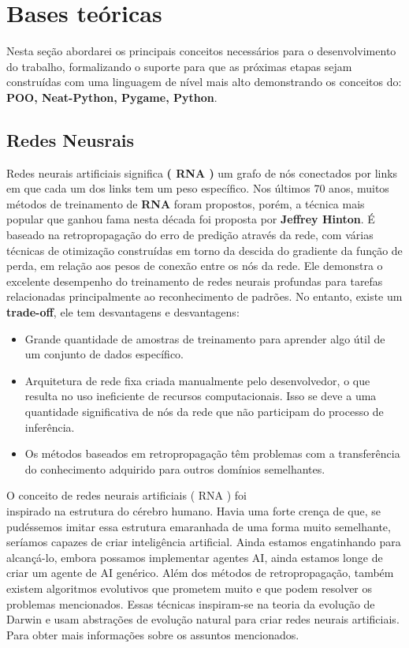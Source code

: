 \section{Bases teóricas}\label{sec:theory}
Nesta seção abordarei os principais conceitos necessários para o desenvolvimento do trabalho, formalizando o suporte para que as próximas etapas sejam construídas com uma
linguagem de nível mais alto demonstrando os conceitos do:\\ \textbf{POO, Neat-Python, Pygame, Python}.
\subsection{Redes Neusrais}
Redes neurais artificiais significa \textbf{( RNA )} um grafo de nós conectados por links em que cada um dos links tem um peso específico.
Nos últimos 70 anos, muitos métodos de treinamento de \textbf{RNA} foram propostos, porém, a técnica mais popular que ganhou fama nesta década foi proposta por \textbf{Jeffrey Hinton}.\cite{rna} É baseado na retropropagação do erro de predição através da rede, com várias técnicas de otimização construídas em torno da descida do gradiente da função de perda, em relação aos pesos de conexão entre os nós da rede. Ele demonstra o excelente desempenho do treinamento de redes neurais profundas para tarefas relacionadas principalmente ao reconhecimento de padrões.
 No entanto, existe um \textbf{trade-off}, ele tem desvantagens  e desvantagens:
\begin{itemize}
    \item Grande quantidade de amostras de treinamento para aprender algo útil de um conjunto de dados específico.\\
     \item Arquitetura de rede fixa criada manualmente pelo desenvolvedor, o que resulta no uso ineficiente de recursos computacionais. Isso se deve a uma quantidade significativa de nós da rede que não participam do processo de inferência. \\
     \item Os métodos baseados em retropropagação têm problemas com a transferência do conhecimento adquirido para outros domínios semelhantes.\\
    
\end{itemize} 
O conceito de redes neurais artificiais ( RNA ) foi\\ inspirado na estrutura do cérebro humano. Havia uma forte crença de que, se pudéssemos imitar essa estrutura emaranhada de uma forma muito semelhante, seríamos capazes de criar inteligência artificial. Ainda estamos engatinhando para alcançá-lo, embora possamos implementar agentes AI,  ainda estamos longe de criar um agente de AI genérico. Além dos métodos de retropropagação, também existem algoritmos evolutivos que prometem muito e que podem resolver os problemas mencionados. Essas técnicas inspiram-se na teoria da evolução de Darwin e usam abstrações de evolução natural para criar redes neurais artificiais.
Para obter mais informações sobre os assuntos mencionados.\cite{Neural_Network_V4}\cite{Neural_Network_V6}

